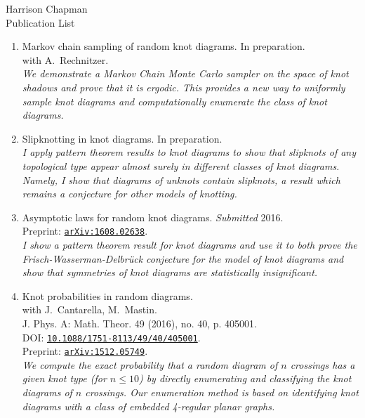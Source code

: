 \documentclass[letterpaper]{article}
\def\name{Harrison Chapman}
\begin{document}
{\huge \name}\\
{\large\sc Publication List}


\begin{enumerate}
\item Markov chain sampling of random knot diagrams. In preparation. \\
  with A.\ Rechnitzer. \\
  \textit{We demonstrate a Markov Chain Monte Carlo sampler on the space of knot
    shadows and prove that it is ergodic. This provides a new way to uniformly
    sample knot diagrams and computationally enumerate the class of knot
    diagrams.}
\item Slipknotting in knot diagrams. In preparation. \\
  \textit{I apply pattern theorem results to knot diagrams to show that
    slipknots of any topological type appear almost surely in different classes
    of knot diagrams. Namely, I show that diagrams of unknots contain slipknots,
    a result which remains a conjecture for other models of knotting.}
\item Asymptotic laws for random knot diagrams. \emph{Submitted} 2016. \\
  Preprint: \href{http://arxiv.org/abs/1608.02638}{\tt arXiv:1608.02638}. \\
  \textit{I show a pattern theorem result for knot diagrams and use it to both
    prove the Frisch-Wasserman-Delbr\"uck conjecture for the model of knot
    diagrams and show that symmetries of knot diagrams are statistically
    insignificant.}
\item Knot probabilities in random diagrams.\\
  with J.\ Cantarella, M.\ Mastin. \\
  J. Phys. A: Math. Theor. 49 (2016), no. 40, p. 405001.\\
  DOI: \href{http://dx.doi.org/10.1088/1751-8113/49/40/405001}{\tt 10.1088/1751-8113/49/40/405001}.\\
  Preprint: \href{http://arxiv.org/abs/1512.05749}{\tt arXiv:1512.05749}. \\
  \textit{We compute the exact probability that a random diagram of
    $n$ crossings has a given knot type (for $n \leq 10$) by directly
    enumerating and classifying the knot diagrams of $n$
    crossings. Our enumeration method is based on identifying knot
    diagrams with a class of embedded 4-regular planar graphs.}

\end{enumerate}
\end{document}
